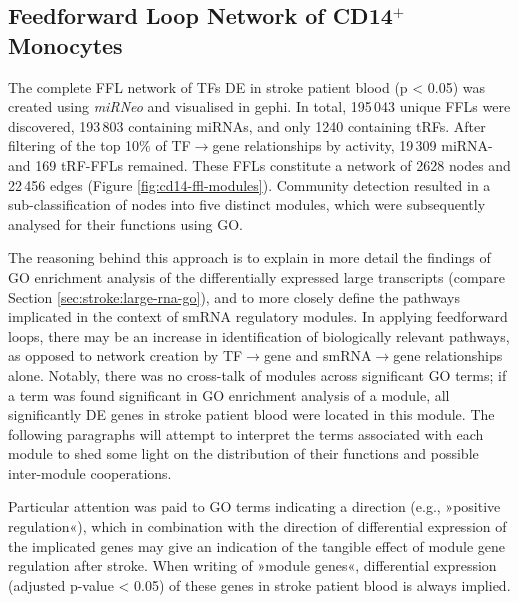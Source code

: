 \subsection{Feedforward Loop Network of CD14$^+$ Monocytes}
The complete FFL network of TFs DE in stroke patient blood (p < 0.05) was created using \emph{miRNeo} and visualised in gephi. In total, 195\,043 unique FFLs were discovered, 193\,803 containing miRNAs, and only 1240 containing tRFs. After filtering of the top 10\% of TF$\to$gene relationships by activity, 19\,309 miRNA- and 169 tRF-FFLs remained. These FFLs constitute a network of 2628 nodes and 22\,456 edges (Figure \ref{fig:cd14-ffl-modules}). Community detection\cite{Blondel2008} resulted in a sub-classification of nodes into five distinct modules, which were subsequently analysed for their functions using GO.

The reasoning behind this approach is to explain in more detail the findings of GO enrichment analysis of the differentially expressed large transcripts (compare Section \ref{sec:stroke:large-rna-go}), and to more closely define the pathways implicated in the context of smRNA regulatory modules. In applying feedforward loops, there may be an increase in identification of biologically relevant pathways, as opposed to network creation by TF$\to$gene and smRNA$\to$gene relationships alone. Notably, there was no cross-talk of modules across significant GO terms; if a term was found significant in GO enrichment analysis of a module, all significantly DE genes in stroke patient blood were located in this module. The following paragraphs will attempt to interpret the terms associated with each module to shed some light on the distribution of their functions and possible inter-module cooperations.

Particular attention was paid to GO terms indicating a direction (e.g., »positive regulation«), which in combination with the direction of differential expression of the implicated genes may give an indication of the tangible effect of module gene regulation after stroke. When writing of »module genes«, differential expression (adjusted p-value < 0.05) of these genes in stroke patient blood is always implied.

